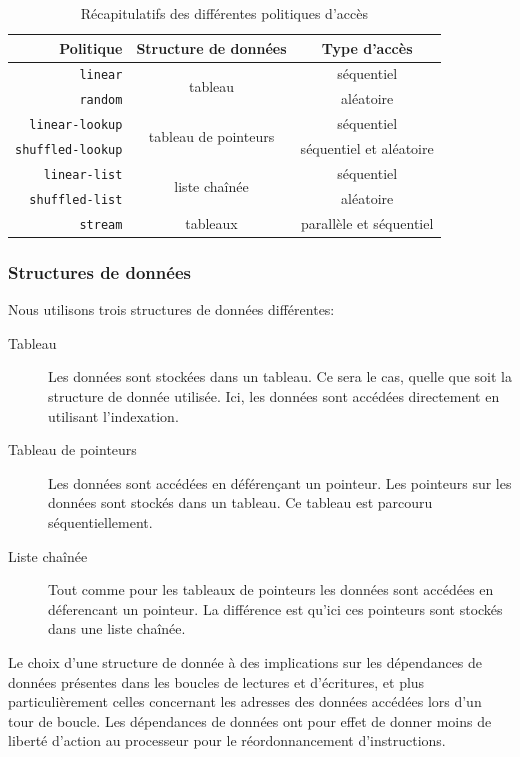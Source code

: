 \begin{table}
	\centering
	\renewcommand{\arraystretch}{1.3}

	\begin{tabular}{r c c}
		\toprule
		\textbf{Politique} & \textbf{Structure de données} & \textbf{Type d'accès} \\
		\midrule
		\texttt{linear} & \multirow{2}{*}{tableau} & séquentiel \\
		\texttt{random} &  & aléatoire \\
		\midrule
		\texttt{linear-lookup} & \multirow{2}{*}{tableau de pointeurs} & séquentiel \\
		\texttt{shuffled-lookup} &  & séquentiel et aléatoire \\
		\midrule
		\texttt{linear-list} & \multirow{2}{*}{liste chaînée} & séquentiel \\
		\texttt{shuffled-list} &  & aléatoire \\
		\midrule
		\texttt{stream} & tableaux & parallèle et séquentiel \\
		\bottomrule
	\end{tabular}
	\caption{\label{table:recap_politiques d'accès}Récapitulatifs des différentes politiques d'accès}
\end{table}

\subsubsection{Structures de données}

Nous utilisons trois structures de données différentes:

\begin{description}
	\item[Tableau] Les données sont stockées dans un tableau. Ce sera le cas, quelle que soit la structure de donnée utilisée.
	Ici, les données sont accédées directement en utilisant l'indexation.
	\item[Tableau de pointeurs] Les données sont accédées en déférençant un pointeur. Les pointeurs sur les données sont stockés dans un tableau. Ce tableau est parcouru séquentiellement.
	\item[Liste chaînée] Tout comme pour les tableaux de pointeurs les données sont accédées en déferencant un pointeur. La différence est qu'ici ces pointeurs sont stockés dans une liste chaînée.
\end{description}

Le choix d'une structure de donnée à des implications sur les dépendances de données présentes dans les boucles de lectures et d'écritures, et plus particulièrement celles concernant les adresses des données accédées lors d'un tour de boucle.
Les dépendances de données ont pour effet de donner moins de liberté d'action au processeur pour le réordonnancement d'instructions.

